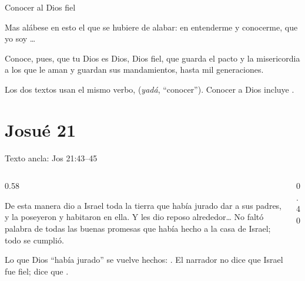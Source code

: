 \begin{frame}{Conocer al Dios fiel}
\begin{cita}Mas alábese en esto el que se hubiere de alabar: en entenderme y conocerme, que yo soy \SENOR{}\ldots{}\end{cita}
\begin{cita}Conoce, pues, que \SENOR{} tu Dios es Dios, Dios fiel, que guarda el pacto y la misericordia a los que le aman y guardan sus mandamientos, hasta mil generaciones.\end{cita}
\small Los dos textos usan el mismo verbo,  (\emph{yadá}, ``conocer''). Conocer a Dios incluye .\par\medskip
\centering
{}
\end{frame}

\section{Josué 21}

\begin{frame}{Texto ancla: Jos 21:43--45}
\begin{columns}[c,onlytextwidth]
\begin{column}{0.58\textwidth}
\begin{cita}De esta manera dio \SENOR{} a Israel toda la tierra que había jurado dar a sus padres, y la poseyeron y habitaron en ella. Y \SENOR{} les dio reposo alrededor\ldots{} No faltó palabra de todas las buenas promesas que \SENOR{} había hecho a la casa de Israel; todo se cumplió.\end{cita}
\small Lo que Dios ``había jurado'' se vuelve hechos: . El narrador no dice que Israel fue fiel; dice que .
\end{column}
\begin{column}{0.40\textwidth}\end{column}
\end{columns}
\end{frame}

